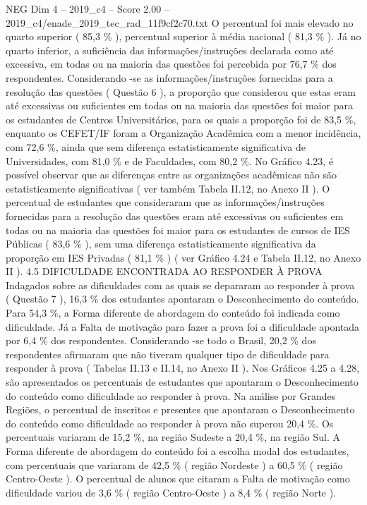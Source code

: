 \begin{textsample}{NEG Dim 4 – 2019\_c4 – Score 2.00 – 2019\_c4/enade\_2019\_tec\_rad\_11f9cf2c70.txt}
O percentual foi mais elevado no quarto superior ( 85,3 \% ), percentual superior à média nacional ( 81,3 \% ).
Já no quarto inferior, a suficiência das informações/instruções declarada como até excessiva, em todas ou na maioria das questões foi percebida por 76,7 \% dos respondentes.
Considerando -se as informações/instruções fornecidas para a resolução das questões ( Questão 6 ), a proporção que considerou que estas eram até excessivas ou suficientes em todas ou na maioria das questões foi maior para os estudantes de Centros Universitários, para os quais a proporção foi de 83,5 \%, enquanto os CEFET/IF foram a Organização Acadêmica com a menor incidência, com 72,6 \%, ainda que sem diferença estatisticamente significativa de Universidades, com 81,0 \% e de Faculdades, com 80,2 \%.
No Gráfico 4.23, é possível observar que as diferenças entre as organizações acadêmicas não são estatisticamente significativas ( ver também Tabela II.12, no Anexo II ).
O percentual de estudantes que consideraram que as informações/instruções fornecidas para a resolução das questões eram até excessivas ou suficientes em todas ou na maioria das questões foi maior para os estudantes de cursos de IES Públicas ( 83,6 \% ), sem uma diferença estatisticamente significativa da proporção em IES Privadas ( 81,1 \% ) ( ver Gráfico 4.24 e Tabela II.12, no Anexo II ). 4.5 DIFICULDADE ENCONTRADA AO RESPONDER À PROVA Indagados sobre as dificuldades com as quais se depararam ao responder à prova ( Questão 7 ), 16,3 \% dos estudantes apontaram o Desconhecimento do conteúdo.
Para 54,3 \%, a Forma diferente de abordagem do conteúdo foi indicada como dificuldade.
Já a Falta de motivação para fazer a prova foi a dificuldade apontada por 6,4 \% dos respondentes.
Considerando -se todo o Brasil, 20,2 \% dos respondentes afirmaram que não tiveram qualquer tipo de dificuldade para responder à prova ( Tabelas II.13 e II.14, no Anexo II ).
Nos Gráficos 4.25 a 4.28, são apresentados os percentuais de estudantes que apontaram o Desconhecimento do conteúdo como dificuldade ao responder à prova.
Na análise por Grandes Regiões, o percentual de inscritos e presentes que apontaram o Desconhecimento do conteúdo como dificuldade ao responder à prova não superou 20,4 \%.
Os percentuais variaram de 15,2 \%, na região Sudeste a 20,4 \%, na região Sul.
A Forma diferente de abordagem do conteúdo foi a escolha modal dos estudantes, com percentuais que variaram de 42,5 \% ( região Nordeste ) a 60,5 \% ( região Centro-Oeste ).
O percentual de alunos que citaram a Falta de motivação como dificuldade variou de 3,6 \% ( região Centro-Oeste ) a 8,4 \% ( região Norte ).

\end{textsample}
